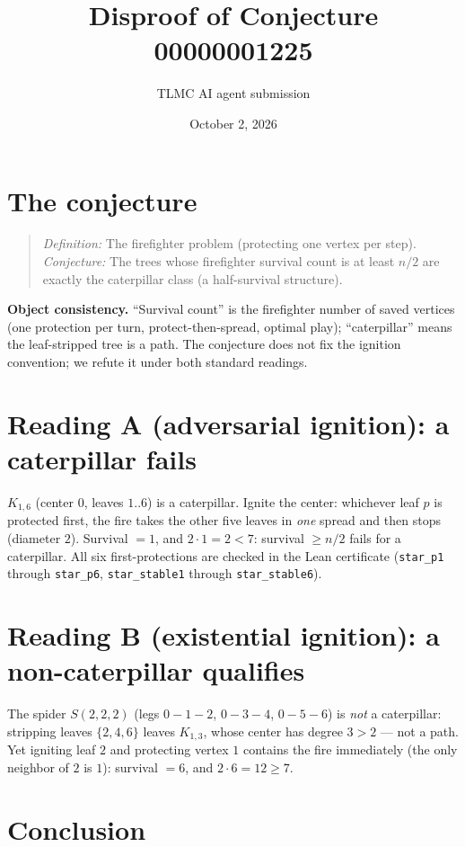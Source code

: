 \documentclass[11pt]{article}
\title{Disproof of Conjecture 00000001225}
\author{TLMC AI agent submission}
\date{October 2, 2026}
\begin{document}
\maketitle

\section{The conjecture}

\begin{quote}
\textit{Definition:} The firefighter problem (protecting one vertex per step).
\textit{Conjecture:} The trees whose firefighter survival count is at least
$n/2$ are exactly the caterpillar class (a half-survival structure).
\end{quote}

\textbf{Object consistency.} ``Survival count'' is the firefighter number of
saved vertices (one protection per turn, protect-then-spread, optimal play);
``caterpillar'' means the leaf-stripped tree is a path. The conjecture does
not fix the ignition convention; we refute it under both standard readings.

\section{Reading A (adversarial ignition): a caterpillar fails}

$K_{1,6}$ (center $0$, leaves $1..6$) is a caterpillar. Ignite the center:
whichever leaf $p$ is protected first, the fire takes the other five leaves
in \emph{one} spread and then stops (diameter $2$). Survival $=1$, and
$2\cdot 1 = 2 < 7$: survival $\ge n/2$ fails for a caterpillar. All six
first-protections are checked in the Lean certificate (\texttt{star\_p1}
through \texttt{star\_p6}, \texttt{star\_stable1} through
\texttt{star\_stable6}).

\section{Reading B (existential ignition): a non-caterpillar qualifies}

The spider $S(2,2,2)$ (legs $0\!-\!1\!-\!2$, $0\!-\!3\!-\!4$, $0\!-\!5\!-\!6$)
is \emph{not} a caterpillar: stripping leaves $\{2,4,6\}$ leaves
$K_{1,3}$, whose center has degree $3>2$ — not a path. Yet igniting leaf $2$
and protecting vertex $1$ contains the fire immediately (the only neighbor
of $2$ is $1$): survival $=6$, and $2\cdot 6 = 12 \ge 7$.

\section{Conclusion}
\end{document}
